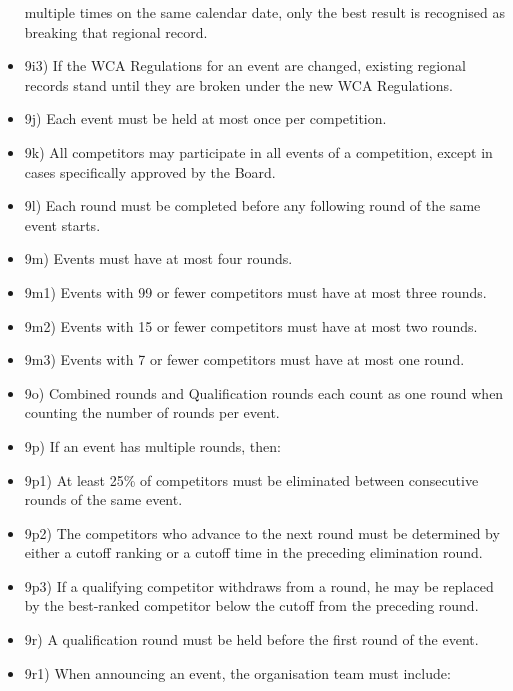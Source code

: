 \begin{itemize}
  multiple times on the same calendar date, only the best result is
  recognised as breaking that regional record.
\item
  9i3) If the WCA Regulations for an event are changed, existing
  regional records stand until they are broken under the new WCA
  Regulations.
\item
  9j) Each event must be held at most once per competition.
\item
  9k) All competitors may participate in all events of a competition,
  except in cases specifically approved by the Board.
\item
  9l) Each round must be completed before any following round of the
  same event starts.
\item
  9m) Events must have at most four rounds.
\item
  9m1) Events with 99 or fewer competitors must have at most three
  rounds.
\item
  9m2) Events with 15 or fewer competitors must have at most two rounds.
\item
  9m3) Events with 7 or fewer competitors must have at most one round.
\item
  9o) Combined rounds and Qualification rounds each count as one round
  when counting the number of rounds per event.
\item
  9p) If an event has multiple rounds, then:
\item
  9p1) At least 25\% of competitors must be eliminated between
  consecutive rounds of the same event.
\item
  9p2) The competitors who advance to the next round must be determined
  by either a cutoff ranking or a cutoff time in the preceding
  elimination round.
\item
  9p3) If a qualifying competitor withdraws from a round, he may be
  replaced by the best-ranked competitor below the cutoff from the
  preceding round.
\item
  9r) A qualification round must be held before the first round of the
  event.
\item
  9r1) When announcing an event, the organisation team must include:


\end{itemize}
